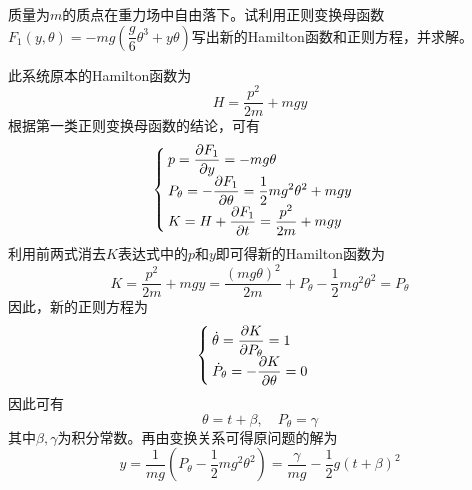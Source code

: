 \begin{question}
质量为$m$的质点在重力场中自由落下。试利用正则变换母函数$F_1(y,\theta) = -mg\left(\dfrac{g}{6} \theta^3 + y\theta\right)$写出新的Hamilton函数和正则方程，并求解。
\end{question}
\begin{solution}
此系统原本的Hamilton函数为
\begin{equation*}
	H = \frac{p^2}{2m}+mgy
\end{equation*}
根据第一类正则变换母函数的结论，可有
\begin{equation*}
\begin{cases}
	\displaystyle p = \frac{\partial F_1}{\partial y} = -mg\theta \\
	\displaystyle P_\theta = -\frac{\partial F_1}{\partial \theta} = \frac12 mg^2\theta^2 + mgy \\
	\displaystyle K = H+\frac{\partial F_1}{\partial t} = \frac{p^2}{2m}+mgy
\end{cases}
\end{equation*}
利用前两式消去$K$表达式中的$p$和$y$即可得新的Hamilton函数为
\begin{equation*}
	K = \frac{p^2}{2m}+mgy = \frac{(mg\theta)^2}{2m}+P_\theta-\frac12 mg^2\theta^2 = P_\theta
\end{equation*}
因此，新的正则方程为
\begin{equation*}
\begin{cases}
	\displaystyle \dot{\theta} = \frac{\partial K}{\partial P_\theta} = 1 \\
	\displaystyle \dot{P}_\theta = -\frac{\partial K}{\partial \theta} = 0
\end{cases}
\end{equation*}
因此可有
\begin{equation*}
	\theta = t+\beta,\quad P_\theta = \gamma
\end{equation*}
其中$\beta, \gamma$为积分常数。再由变换关系可得原问题的解为
\begin{equation*}
	y = \frac{1}{mg}\left(P_\theta-\frac12 mg^2\theta^2\right) = \frac{\gamma}{mg} - \frac12 g(t+\beta)^2
\end{equation*}
\end{solution}

